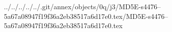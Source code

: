 ../../../../../.git/annex/objects/0q/j3/MD5E-s4476--5a67a08947f19f36a2eb38517a6d17e0.tex/MD5E-s4476--5a67a08947f19f36a2eb38517a6d17e0.tex